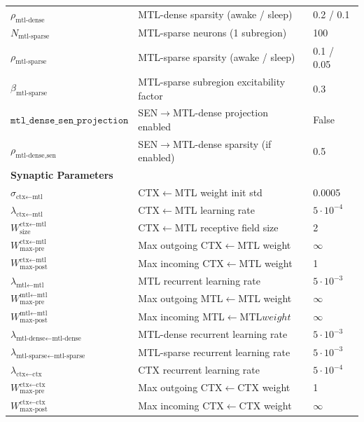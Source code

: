 \documentclass{article}
\begin{document}
\begin{table}[ht]
\begin{tabular}{lp{6cm}l}
$\rho_{\text{mtl-dense}}$ & MTL-dense sparsity (awake / sleep) & 0.2 / 0.1 \\
$N_{\text{mtl-sparse}}$ & MTL-sparse neurons (1 subregion) & 100 \\
$\rho_{\text{mtl-sparse}}$ & MTL-sparse sparsity (awake / sleep) & 0.1 / 0.05 \\
$\beta_{\text{mtl-sparse}}$ & MTL-sparse subregion excitability factor & 0.3 \\
$\texttt{mtl\_dense\_sen\_projection}$ & SEN$\to$MTL-dense projection enabled & False \\
$\rho_{\text{mtl-dense,sen}}$ & SEN$\to$MTL-dense sparsity (if enabled) & 0.5 \\
\midrule
\multicolumn{3}{l}{\textbf{Synaptic Parameters}} \\
\midrule
$\sigma_{\text{ctx}\leftarrow\text{mtl}}$ & CTX$\leftarrow$MTL weight init std & 0.0005 \\
$\lambda_{\text{ctx}\leftarrow\text{mtl}}$ & CTX$\leftarrow$MTL learning rate & $5\cdot 10^{-4}$ \\
$W^{\text{ctx}\leftarrow\text{mtl}}_{\text{size}}$ & CTX$\leftarrow$MTL receptive field size & 2 \\
$W^{\text{ctx}\leftarrow\text{mtl}}_{\text{max-pre}}$ & Max outgoing CTX$\leftarrow$MTL weight & $\infty$ \\
$W^{\text{ctx}\leftarrow\text{mtl}}_{\text{max-post}}$ & Max incoming CTX$\leftarrow$MTL weight & 1 \\
$\lambda_{\text{mtl}\leftarrow\text{mtl}}$ & MTL recurrent learning rate & $5\cdot 10^{-3}$ \\
$W^{\text{mtl}\leftarrow\text{mtl}}_{\text{max-pre}}$ & Max outgoing MTL$\leftarrow$MTL weight & $\infty$ \\
$W^{\text{mtl}\leftarrow\text{mtl}}_{\text{max-post}}$ & Max incoming MTL$\leftarrow\text{MTL} weight$ & $\infty$ \\
$\lambda_{\text{mtl-dense}\leftarrow\text{mtl-dense}}$ & MTL-dense recurrent learning rate & $5\cdot 10^{-3}$ \\
$\lambda_{\text{mtl-sparse}\leftarrow\text{mtl-sparse}}$ & MTL-sparse recurrent learning rate & $5\cdot 10^{-3}$ \\
$\lambda_{\text{ctx}\leftarrow\text{ctx}}$ & CTX recurrent learning rate & $5\cdot 10^{-4}$ \\
$W^{\text{ctx}\leftarrow\text{ctx}}_{\text{max-pre}}$ & Max outgoing CTX$\leftarrow$CTX weight & 1 \\
$W^{\text{ctx}\leftarrow\text{ctx}}_{\text{max-post}}$ & Max incoming CTX$\leftarrow$CTX weight & $\infty$ \\

\end{tabular}
\end{table}
\end{document}
